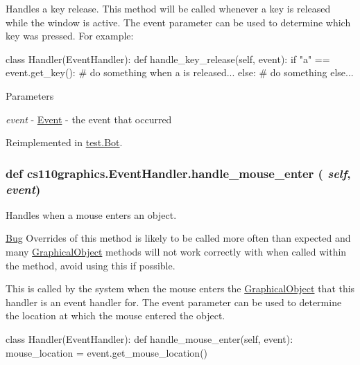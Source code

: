 Handles a key release. This method will be called whenever a key is released while the window is active. The event parameter can be used to determine which key was pressed. For example: 
\begin{DoxyCode}
 class Handler(EventHandler):
     def handle_key_release(self, event):
         if "a" == event.get_key():
             # do something when a is released...
         else:
             # do something else...
\end{DoxyCode}
 
\begin{DoxyParams}{Parameters}
\item[{\em event}]-\/ \hyperlink{classcs110graphics_1_1Event}{Event} -\/ the event that occurred \end{DoxyParams}


Reimplemented in \hyperlink{classtest_1_1Bot_a173d0fff530e0987193e9006b24f218b}{test.Bot}.\hypertarget{classcs110graphics_1_1EventHandler_a13af3268f8a1aa36b8483eb2deffef15}{
\subsubsection[{handle\_\-mouse\_\-enter}]{\setlength{\rightskip}{0pt plus 5cm}def cs110graphics.EventHandler.handle\_\-mouse\_\-enter ( {\em self}, \/   {\em event})}}
\label{classcs110graphics_1_1EventHandler_a13af3268f8a1aa36b8483eb2deffef15}


Handles when a mouse enters an object. \begin{Desc}
\item[\hyperlink{bug__bug000001}{Bug}]Overrides of this method is likely to be called more often than expected and many \hyperlink{classcs110graphics_1_1GraphicalObject}{GraphicalObject} methods will not work correctly with when called within the method, avoid using this if possible.\end{Desc}
This is called by the system when the mouse enters the \hyperlink{classcs110graphics_1_1GraphicalObject}{GraphicalObject} that this handler is an event handler for. The event parameter can be used to determine the location at which the mouse entered the object. 
\begin{DoxyCode}
 class Handler(EventHandler):
     def handle_mouse_enter(self, event):
         mouse_location = event.get_mouse_location()
\end{DoxyCode}
 
